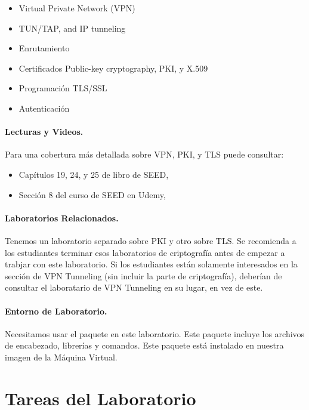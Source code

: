 \begin{itemize}[noitemsep]
\item Virtual Private Network (VPN)
\item TUN/TAP, and IP tunneling 
\item Enrutamiento
\item Certificados Public-key cryptography, PKI, y X.509 
\item Programación TLS/SSL
\item Autenticación
\end{itemize}


\paragraph{Lecturas y Videos.}
Para una cobertura más detallada sobre VPN, PKI, y TLS puede consultar:

\begin{itemize}
\item Capítulos 19, 24, y 25 de libro de SEED, \seedbook
\item Sección 8 del curso de SEED en Udemy, \seedisvideo
\end{itemize}


\paragraph{Laboratorios Relacionados.}
Tenemos un laboratorio separado sobre PKI y otro sobre TLS. Se recomienda a los estudiantes terminar esos laboratorios de criptografía antes de empezar a trabjar con este laboratorio. Si los estudiantes están solamente interesados en la sección de VPN Tunneling (sin incluir la parte de criptografía), deberían de consultar el laboratario de VPN Tunneling en su lugar, en vez de este.

\paragraph{Entorno de Laboratorio.} 
\seedenvironmentB
Necesitamos usar el paquete \openssl en este laboratorio. Este paquete incluye los archivos de encabezado, librerías y comandos. Este paquete está instalado en nuestra imagen de la Máquina Virtual.




\newpage
\section{Tareas del Laboratorio}

